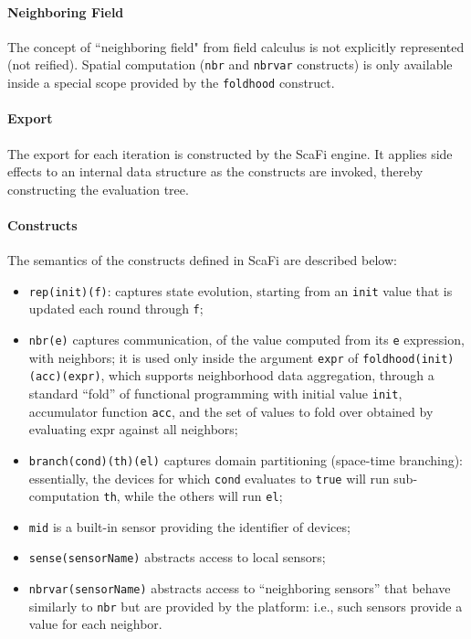 \paragraph{Neighboring Field}
The concept of ``neighboring field" from field calculus is not explicitly represented (not reified). Spatial computation (\texttt{nbr} and \texttt{nbrvar} constructs) is only available inside a special scope provided by the \texttt{foldhood} construct.

\paragraph{Export}
The export for each iteration is constructed by the ScaFi engine. It applies side effects to an internal data structure as the constructs are invoked, thereby constructing the evaluation tree.

\paragraph{Constructs}
The semantics of the constructs defined in ScaFi are described below:
\begin{itemize}
    \item \texttt{rep(init)(f)}: captures state evolution, starting from an \texttt{init} value that is updated each round through \texttt{f};
    \item \texttt{nbr(e)} captures communication, of the value computed from its \texttt{e} expression, with neighbors; it is used only inside the argument \texttt{expr} of \texttt{foldhood(init)(acc)(expr)}, which supports neighborhood data aggregation, through a standard “fold” of functional programming with initial value \texttt{init}, accumulator function \texttt{acc}, and the set of values to fold over obtained by evaluating expr against all neighbors;
    \item \texttt{branch(cond)(th)(el)} captures domain partitioning (space-time branching): essentially, the devices for which \texttt{cond} evaluates to \texttt{true} will run sub-computation \texttt{th}, while the others will run \texttt{el};
    \item \texttt{mid} is a built-in sensor providing the identifier of devices;
    \item \texttt{sense(sensorName)} abstracts access to local sensors;
    \item \texttt{nbrvar(sensorName)} abstracts access to “neighboring sensors” that behave similarly to \texttt{nbr} but are provided by the platform: i.e., such sensors provide a value for each neighbor.
\end{itemize}

